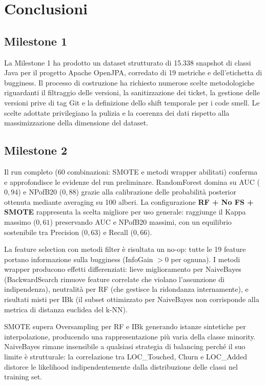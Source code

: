 \section{Conclusioni}

\subsection{Milestone 1}

La Milestone 1 ha prodotto un dataset strutturato di 15.338 snapshot di classi Java per
il progetto Apache OpenJPA, corredato di 19 metriche e
dell'etichetta di bugginess. Il processo di costruzione ha richiesto numerose scelte
metodologiche riguardanti il filtraggio delle versioni, la sanitizzazione dei ticket, la
gestione delle versioni prive di tag Git e la definizione dello shift temporale per i code
smell. Le scelte adottate privilegiano la pulizia e la coerenza dei dati rispetto alla
massimizzazione della dimensione del dataset.

\subsection{Milestone 2}

Il run completo (60 combinazioni: SMOTE e metodi wrapper abilitati) conferma e
approfondisce le evidenze del run preliminare. RandomForest domina su AUC ($0{,}94$)
e NPofB20 ($0{,}88$) grazie alla calibrazione delle probabilità posterior ottenuta
mediante averaging su 100 alberi. La configurazione \textbf{RF + No FS + SMOTE}
rappresenta la scelta migliore per uso generale: raggiunge il Kappa massimo ($0{,}61$)
preservando AUC e NPofB20 massimi, con un equilibrio sostenibile tra Precision ($0{,}63$)
e Recall ($0{,}66$).

La feature selection con metodi filter è risultata un no-op: tutte le 19 feature portano
informazione sulla bugginess (InfoGain $> 0$ per ognuna). I metodi wrapper producono
effetti differenziati: lieve miglioramento per NaiveBayes (BackwardSearch rimuove feature
correlate che violano l'assunzione di indipendenza), neutralità per RF (che gestisce la
ridondanza internamente), e risultati misti per IBk (il subset ottimizzato per NaiveBayes
non corrisponde alla metrica di distanza euclidea del k-NN).

SMOTE supera Oversampling per RF e IBk generando istanze sintetiche per interpolazione,
producendo una rappresentazione più varia della classe minority. NaiveBayes rimane
insensibile a qualsiasi strategia di balancing perché il suo limite è strutturale:
la correlazione tra LOC\_Touched, Churn e LOC\_Added distorce le likelihood
indipendentemente dalla distribuzione delle classi nel training set.

